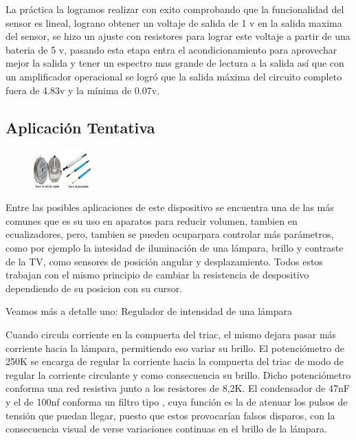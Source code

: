 \documentclass[12pt, fleqn]{article}                            %
\theoremstyle{break}                                            %
\begin{document}
        La práctica la logramos realizar con exito comprobando que la funcionalidad del sensor es lineal,
        lograno obtener un voltaje de salida de 1 v en la salida maxima del sensor, se hizo un ajuste con
        resistores para lograr este voltaje a partir de una bateria de 5 v, pasando esta etapa entra el 
        acondicionamiento para aprovechar mejor la salida y tener un espectro mas grande de lectura a la
        salida así que con un amplificador operacional se logró que la salida máxima del circuito completo
        fuera de 4.83v y la mínima de 0.07v.




    \subsection{Aplicación Tentativa} 

        \begin{figure}
                \centering
                \includegraphics[width=0.20\textwidth]{Aplicaciones1}
            \end{figure}

        Entre las posibles aplicaciones de este dispositivo se encuentra una de las más comunes que es 
        su uso en aparatos para reducir volumen, tambien en ecualizadores, pero, tambien se pueden ocuparpara controlar más 
        parámetros, como por ejemplo la intesidad de iluminación de una lámpara, brillo y contraste de la TV, como sensores 
        de posición angular y desplazamiento.
        Todos estos trabajan con el mismo principio de cambiar la resistencia de despositivo dependiendo de su posicion con
        su cursor.

        Veamos más a detalle uno: Regulador de intensidad de una lámpara

        Cuando circula corriente en la compuerta del triac, el mismo dejara pasar más corriente
        hacia la lámpara, permitiendo eso variar su brillo. El potenciómetro de 250K se encarga de
        regular la corriente hacia la compuerta del triac de modo de regular la corriente circulante
        y como consecuencia su brillo.
        Dicho potenciómetro conforma una red resistiva junto a los resistores de 8,2K.
        El condensador de 47nF y el de 100nf conforma un filtro tipo , cuya 
        función es la de atenuar los pulsos de tensión que puedan llegar, puesto que estos 
        provocarían falsos disparos, con la consecuencia visual de verse variaciones continuas en el
        brillo de la lámpara.
\end{document}
